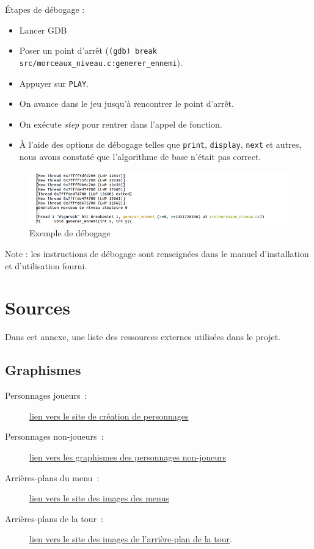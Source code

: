 \documentclass[a4paper,12pt]{article}
\begin{document}
\begin{appendices}
Étapes de débogage : 
\begin{itemize}
	\item Lancer GDB
	\item Poser un point d'arrêt (\texttt{(gdb) break src/morceaux\_niveau.c:generer\_ennemi}).
	\item Appuyer sur \texttt{PLAY}.
	\item On avance dans le jeu jusqu'à rencontrer le point d'arrêt.
	\item On exécute \textit{step} pour rentrer dans l'appel de fonction.
	\item À l'aide des options de débogage telles que \texttt{print}, \texttt{display}, \texttt{next} et autres, nous avons constaté que l'algorithme de base n'était pas correct.
\end{itemize}
\begin{figure}[H]
	\centering
	\includegraphics[width=\textwidth]{img/debug.png}
	\caption{Exemple de débogage}
	\label{débogage}
\end{figure}
Note : les instructions de débogage sont renseignées dans le manuel d'installation et d'utilisation fourni. \\

\section{Sources}

Dans cet annexe, une liste des ressources externes utilisées dans le projet.

\subsection{Graphismes}
\begin{description}
	\item[Personnages joueurs :] \href{https://sanderfrenken.github.io/Universal-LPC-Spritesheet-Character-Generator/#?body=Body_color_light&head=Human_male_light}{lien vers le site de création de personnages}
	\item[Personnages non-joueurs :] \href{https://craftpix.net/freebies/free-fantasy-enemies-pixel-art-sprite-pack/}{lien vers les graphismes des personnages non-joueurs}
	\item[Arrières-plans du menu :] \href{https://fr.freepik.com/psd-gratuit/rendu-3d-illustration-chambre-royale_38612904.htm#query=jeux\%202d\%20medievale&position=3&from_view=keyword&track=ais&uuid=be1b354a-483d-48a5-867b-e3027182dea7}{lien vers le site des images des menus}
	\item[Arrières-plans de la tour :] \href{https://free-game-assets.itch.io/free-sky-with-clouds-background-pixel-art-set}{lien vers le site des images de l'arrière-plan de la tour}.
\end{description}


\end{appendices}
\end{document}
